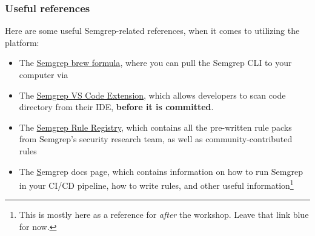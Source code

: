 \documentclass[aspectratio=169, handout]{beamer}
\begin{document}
\begin{frame}[fragile]
  \frametitle{Useful references}

  Here are some useful Semgrep-related references, when it comes to utilizing the platform:

  \vspace{5pt}

  \begin{itemize}
    \item The {\color{blue}\href{https://formulae.brew.sh/formula/semgrep}{Semgrep brew formula}}, where you can
    pull the Semgrep CLI to your computer via 
    \item The {\color{blue}\href{https://marketplace.visualstudio.com/items?itemName=Semgrep.semgrep}{Semgrep VS Code Extension}},
    which allows developers to scan code directory from their IDE, \textbf{before it is committed}.
    \item The {\color{blue}\href{https://semgrep.dev/r}{Semgrep Rule Registry}}, which contains
    all the pre-written rule packs from Semgrep's security research team, as well as community-contributed
    rules
    \item The {\color{blue}\href{https://semgrep.dev/docs/}Semgrep docs page}, which contains
    information on how to run Semgrep in your CI/CD pipeline, how to write rules, and other
    useful information\footnote{This is mostly here as a reference for \textit{after} the workshop. Leave
    that link blue for now.}
  \end{itemize}
\end{frame}
\end{document}
